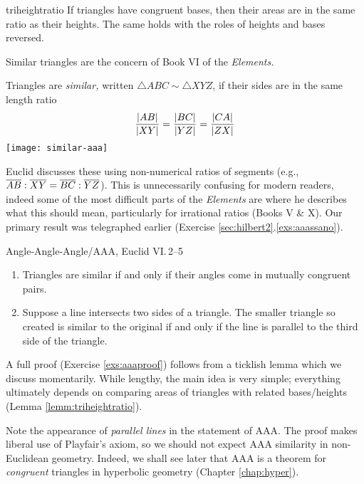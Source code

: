 \begin{lemm}{}{triheightratio}
	If triangles have congruent bases, then their areas are in the same ratio as their heights. The same holds with the roles of heights and bases reversed.
\end{lemm} 



Similar triangles are the concern of Book VI of the \emph{Elements.}

\begin{defn}[lower separated=false, sidebyside, sidebyside align=top seam, sidebyside gap=0pt, righthand width=0.32\linewidth]{}{}
	Triangles are \emph{similar,} written $\triangle ABC\sim\triangle XYZ$, if their sides are in the same length ratio
	\[
		\frac{\left| AB\right|}{\left| XY\right|}=\frac{\left| BC\right|}{\left| YZ\right|}=\frac{\left| CA\right|}{\left| ZX\right|}
	\]
	\tcblower
	\flushright\texttt{[image: similar-aaa]}
\end{defn}

Euclid discusses these using non-numerical ratios of segments (e.g., $\overline{AB}:\overline{XY}=\overline{BC}:\overline{YZ}$). This is unnecessarily confusing for modern readers, indeed some of the most difficult parts of the \emph{Elements} are where he describes what this should mean, particularly for irrational ratios (Books V \& X).\medbreak
Our primary result was telegraphed earlier (Exercise \ref*{sec:hilbert2}.\ref{exs:aaassano}).

\begin{thm}{Angle-Angle-Angle/AAA, Euclid VI.\,2--5}{}
	\begin{enumerate}
	  \item Triangles are similar if and only if their angles come in mutually congruent pairs.
	  \item Suppose a line intersects two sides of a triangle. The smaller triangle so created is similar to the original if and only if the line is parallel to the third side of the triangle.
	\end{enumerate}
\end{thm}

A full proof (Exercise \ref{exs:aaaproof}) follows from a ticklish lemma which we discuss momentarily. While lengthy, the main idea is very simple; everything ultimately depends on comparing areas of triangles with related bases/heights (Lemma \ref{lemm:triheightratio}).\smallbreak

Note the appearance of \emph{parallel lines} in the statement of AAA. The proof makes liberal use of Playfair's axiom, so we should not expect AAA similarity in non-Euclidean geometry. Indeed, we shall see later that AAA is a theorem for \emph{congruent} triangles in hyperbolic geometry (Chapter \ref{chap:hyper}).


